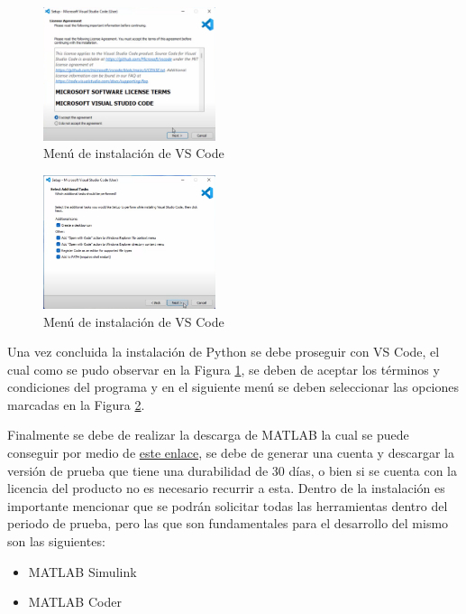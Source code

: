\begin{figure}[h!]
    \centering
    \includegraphics[width=0.45\textwidth]{fig/especifico_2/Ambiente_matlab/instalacion_vs_code.png}
    \caption{Menú de instalación de VS Code}
    \label{fig:menu_vscode}
\end{figure}


\begin{figure}[h!]
    \centering
    \includegraphics[width=0.45\textwidth]{fig/especifico_2/Ambiente_matlab/opciones_adicionales_vs_code.png}
    \caption{Menú de instalación de VS Code}
    \label{fig:menu_vscode_adicionales}
\end{figure}

Una vez concluida la instalación de Python se debe proseguir con VS Code, el cual como se pudo observar en la Figura \ref{fig:menu_vscode}, se deben de aceptar los términos y condiciones del programa y en el siguiente menú se deben seleccionar las opciones marcadas en la Figura \ref{fig:menu_vscode_adicionales}.

Finalmente se debe de realizar la descarga de MATLAB la cual se puede conseguir por medio de \href{https://matlab.mathworks.com/}{este enlace}, se debe de generar una cuenta y descargar la versión de prueba que tiene una durabilidad de 30 días, o bien si se cuenta con la licencia del producto no es necesario recurrir a esta. Dentro de la instalación es importante mencionar que se podrán solicitar todas las herramientas dentro del periodo de prueba, pero las que son fundamentales para el desarrollo del mismo son las siguientes:

\begin{itemize}
    \item MATLAB Simulink
    \item MATLAB Coder
\end{itemize}

